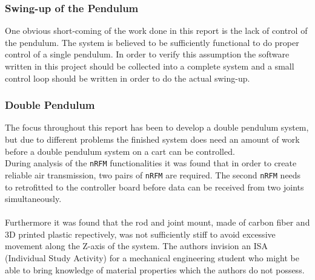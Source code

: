 \subsubsection{Swing-up of the Pendulum} %
\label{ssub:swing_up_of_the_pendulum}
One obvious short-coming of the work done in this report is the lack of control of the pendulum.
The system is believed to be sufficiently functional to do proper control of a single pendulum.
In order to verify this assumption the software written in this project should be collected into a complete system and a small control loop should be written in order to do the actual swing-up.

\subsubsection{Double Pendulum} %
\label{ssub:double_pendulum}
The focus throughout this report has been to develop a double pendulum system, but due to different problems the finished system does need an amount of work before a double pendulum system on a cart can be controlled.
\\
During analysis of the \texttt{nRFM} functionalities it was found that in order to create reliable air transmission, two pairs of \texttt{nRFM} are required.
The second \texttt{nRFM} needs to retrofitted to the controller board before data can be received from two joints simultaneously.
\\~\\
Furthermore it was found that the rod and joint mount, made of carbon fiber and 3D printed plastic repectively, was not sufficiently stiff to avoid excessive movement along the Z-axis of the system.
The authors invision an ISA (Individual Study Activity) for a mechanical engineering student who might be able to bring knowledge of material properties which the authors do not possess.
